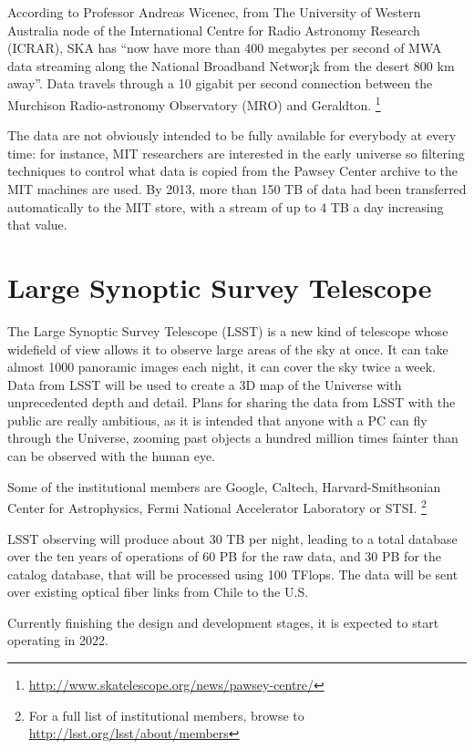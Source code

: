According to Professor Andreas Wicenec, from The University of Western Australia node of the International Centre for Radio Astronomy Research (ICRAR), SKA has ``now have more than 400 megabytes per second of MWA data streaming along the National Broadband Networ¡k from the desert 800 km away''. Data travels through a 10 gigabit per second connection between the Murchison Radio-astronomy Observatory (MRO) and Geraldton. \footnote{\url{http://www.skatelescope.org/news/pawsey-centre/}}

The data are not obviously intended to be fully available for everybody at every time: for instance, MIT researchers are interested in the early universe so filtering techniques to control what data is copied from the Pawsey Center archive to the MIT machines are used. By 2013, more than 150 TB of data had been transferred automatically to the MIT store, with a stream of up to 4 TB a day increasing that value. 




\section{Large Synoptic Survey Telescope}

The Large Synoptic Survey Telescope (LSST) is a new kind of telescope whose widefield of view allows it to observe large areas of the sky at once. It can take almost 1000 panoramic images each night, it can cover the sky twice a week. Data from LSST will be used to create a 3D map of the Universe with unprecedented depth and detail. Plans for sharing the data from LSST with the public are really ambitious, as it is intended that anyone with a PC can fly through the Universe, zooming past objects a hundred million times fainter than can be observed with the human eye. 

Some of the institutional members are Google, Caltech, Harvard-Smithsonian Center for Astrophysics, Fermi National Accelerator Laboratory or STSI. \footnote{For a full list of institutional members, browse to \url{http://lsst.org/lsst/about/members}}  


LSST observing will produce about 30 TB per night, leading to a total database over the ten years of operations of 60 PB for the raw data, and 30 PB for the catalog database, that will be processed using 100 TFlops. The data will be sent over existing optical fiber links from Chile to the U.S. 

Currently finishing the design and development stages, it is expected to start operating in 2022.